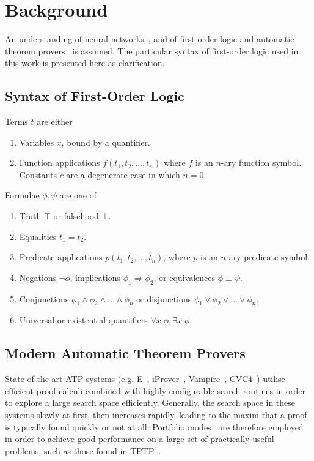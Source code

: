 \documentclass[runningheads]{llncs}
\begin{document}
\section{Background}
An understanding of neural networks~\cite{neural-survey}, and of first-order logic and automatic theorem provers~\cite{fol-atp-survey} is assumed.
The particular syntax of first-order logic used in this work is presented here as clarification.

\subsection{Syntax of First-Order Logic}
Terms \(t\) are either
\begin{enumerate}
	\item Variables \(x\), bound by a quantifier.
	\item Function applications \(f\left(t_1, t_2, \ldots, t_n\right)\) where \(f\) is an \(n\)-ary function symbol. Constants \(c\) are a degenerate case in which \(n = 0\).
\end{enumerate}
%
Formulae \(\phi, \psi\) are one of
\begin{enumerate}
	\item Truth \(\top\) or falsehood \(\bot\).
	\item Equalities \(t_1 = t_2\).
	\item Predicate applications \(p\left(t_1, t_2, \ldots, t_n\right)\), where \(p\) is an \(n\)-ary predicate symbol.
	\item Negations \(\lnot \phi\), implications \(\phi_1 \Rightarrow \phi_2\), or equivalences \(\phi \equiv \psi\).
	\item Conjunctions \(\phi_1 \wedge \phi_2 \wedge \ldots \wedge \phi_n\) or disjunctions \(\phi_1 \vee \phi_2 \vee \ldots \vee \phi_n\).
	\item Universal or existential quantifiers \(\forall x. \phi, \exists x. \phi\).
\end{enumerate}

\subsection{Modern Automatic Theorem Provers}
State-of-the-art ATP systems (e.g. E~\cite{E}, iProver~\cite{iProver}, Vampire~\cite{Vampire}, CVC4~\cite{CVC4}) utilise efficient proof calculi combined with highly-configurable search routines in order to explore a large search space efficiently.
Generally, the search space in these systems slowly at first, then increases rapidly, leading to the maxim that a proof is typically found quickly or not at all.
Portfolio modes~\cite{portfolio} are therefore employed in order to achieve good performance on a large set of practically-useful problems, such as those found in TPTP~\cite{TPTP}.
\end{document}
